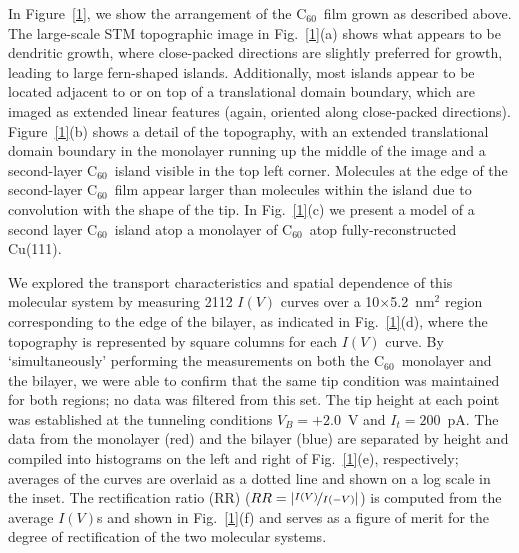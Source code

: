 \documentclass[11pt,showpacs,amsmath,amssymbl]{revtex4}
\newcommand{\buck}{C$_{60}$~}
\begin{document}
In Figure~\ref{1}, we show the arrangement of the \buck film grown as described above. The large-scale STM topographic image in Fig.~\ref{1}(a) shows what appears to be dendritic growth, where close-packed directions are slightly preferred for growth, leading to large fern-shaped islands.  Additionally, most islands appear to be located adjacent to or on top of a translational domain boundary, which are imaged as extended linear features (again, oriented along close-packed directions). Figure~\ref{1}(b) shows a detail of the topography, with an extended translational domain boundary in the monolayer running up the middle of the image and a second-layer \buck island visible in the top left corner.  Molecules at the edge of the second-layer \buck film appear larger than molecules within the island due to convolution with the shape of the tip.  In Fig.~\ref{1}(c) we present a model of a second layer \buck island atop a monolayer of \buck atop fully-reconstructed Cu(111).

We explored the transport characteristics and spatial dependence of this molecular system by measuring 2112 $I(V)$ curves over a 10$\times$5.2~nm$^2$ region corresponding to the edge of the bilayer, as indicated in Fig.~\ref{1}(d), where the topography is represented by square columns for each $I(V)$ curve.  By `simultaneously' performing the measurements on both the \buck  monolayer and the bilayer, we were able to confirm that the same tip condition was maintained for both regions; no data was filtered from this set. The tip height at each point was established at the tunneling conditions $V_B=+2.0$~V and $I_{t}=200$~pA.  The data from the monolayer (red) and the bilayer (blue) are separated by height and compiled into histograms on the left and right of Fig.~\ref{1}(e), respectively; averages of the curves are overlaid as a dotted line and shown on a log scale in the inset.  The rectification ratio (RR) ($RR = \left| \nicefrac{I(V)}{I(-V)} \right| $) is computed from the average $I(V)$s and shown in Fig.~\ref{1}(f) and serves as a figure of merit for the degree of rectification of the two molecular systems.
\end{document}
